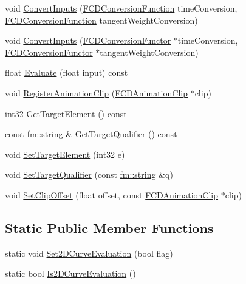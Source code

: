 \begin{DoxyCompactItemize}
\item 
void \hyperlink{classFCDAnimationCurve_ac77614a66e9af65e55370da9c41232a7}{ConvertInputs} (\hyperlink{FCDAnimationCurve_8h_a3f37db4cc9939d7b076d4cbfe81680c4}{FCDConversionFunction} timeConversion, \hyperlink{FCDAnimationCurve_8h_a3f37db4cc9939d7b076d4cbfe81680c4}{FCDConversionFunction} tangentWeightConversion)
\item 
void \hyperlink{classFCDAnimationCurve_a6b61e8a04977404fac8063b6b464ac1d}{ConvertInputs} (\hyperlink{classFCDConversionFunctor}{FCDConversionFunctor} $\ast$timeConversion, \hyperlink{classFCDConversionFunctor}{FCDConversionFunctor} $\ast$tangentWeightConversion)
\item 
float \hyperlink{classFCDAnimationCurve_a66887cf60eb77e03592173e6cebec028}{Evaluate} (float input) const 
\item 
void \hyperlink{classFCDAnimationCurve_ae255cbba1e90984157274f5713f32342}{RegisterAnimationClip} (\hyperlink{classFCDAnimationClip}{FCDAnimationClip} $\ast$clip)
\item 
int32 \hyperlink{classFCDAnimationCurve_a686961ad58773191b3426600c6e0c375}{GetTargetElement} () const 
\item 
const \hyperlink{classfm_1_1stringT}{fm::string} \& \hyperlink{classFCDAnimationCurve_aeb17123216607ff98554547641936180}{GetTargetQualifier} () const 
\item 
void \hyperlink{classFCDAnimationCurve_a27ff11a7446c95582551eb221993af4b}{SetTargetElement} (int32 e)
\item 
void \hyperlink{classFCDAnimationCurve_a9d69a7d44da85da5dfbb8a1489f282a4}{SetTargetQualifier} (const \hyperlink{classfm_1_1stringT}{fm::string} \&q)
\item 
void \hyperlink{classFCDAnimationCurve_af70751917c31d65a35e96211f31cf239}{SetClipOffset} (float offset, const \hyperlink{classFCDAnimationClip}{FCDAnimationClip} $\ast$clip)
\end{DoxyCompactItemize}
\subsection*{Static Public Member Functions}
\begin{DoxyCompactItemize}
\item 
static void \hyperlink{classFCDAnimationCurve_a97853d967dc312958463ee42ced34f64}{Set2DCurveEvaluation} (bool flag)
\item 
static bool \hyperlink{classFCDAnimationCurve_a1dc8857d6e5677454ebabbc6df39da9f}{Is2DCurveEvaluation} ()
\end{DoxyCompactItemize}


